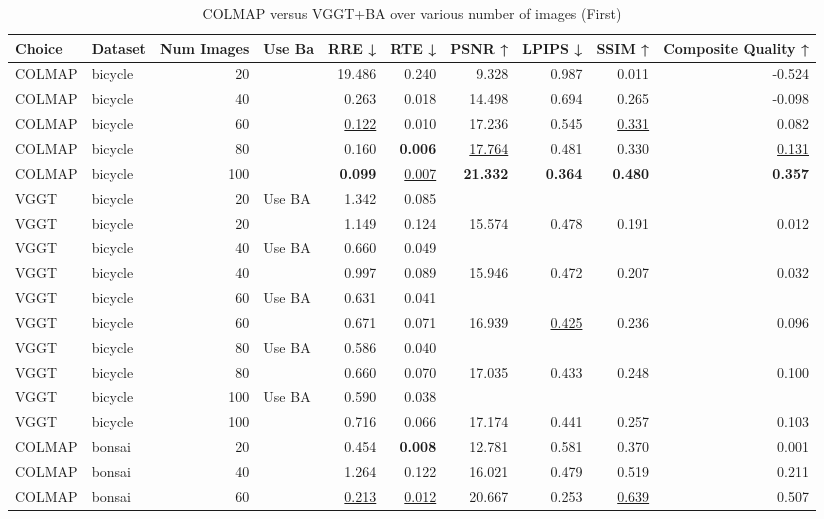 \begin{table}[H]
\caption{COLMAP versus VGGT+BA over various number of images (First)}
\label{tab:01_num_images_use_ba_first}
\small
\begin{tabular}{llrlrrrrrr}
\toprule
Choice & Dataset & Num Images & Use Ba & RRE ↓ & RTE ↓ & PSNR ↑ & LPIPS ↓ & SSIM ↑ & Composite Quality ↑ \\
\midrule
COLMAP & bicycle & 20 &  & 19.486 & 0.240 & 9.328 & 0.987 & 0.011 & -0.524 \\
COLMAP & bicycle & 40 &  & 0.263 & 0.018 & 14.498 & 0.694 & 0.265 & -0.098 \\
COLMAP & bicycle & 60 &  & \underline{0.122} & 0.010 & 17.236 & 0.545 & \underline{0.331} & 0.082 \\
COLMAP & bicycle & 80 &  & 0.160 & \textbf{0.006} & \underline{17.764} & 0.481 & 0.330 & \underline{0.131} \\
COLMAP & bicycle & 100 &  & \textbf{0.099} & \underline{0.007} & \textbf{21.332} & \textbf{0.364} & \textbf{0.480} & \textbf{0.357} \\
VGGT & bicycle & 20 & Use BA & 1.342 & 0.085 &  &  &  &  \\
VGGT & bicycle & 20 &  & 1.149 & 0.124 & 15.574 & 0.478 & 0.191 & 0.012 \\
VGGT & bicycle & 40 & Use BA & 0.660 & 0.049 &  &  &  &  \\
VGGT & bicycle & 40 &  & 0.997 & 0.089 & 15.946 & 0.472 & 0.207 & 0.032 \\
VGGT & bicycle & 60 & Use BA & 0.631 & 0.041 &  &  &  &  \\
VGGT & bicycle & 60 &  & 0.671 & 0.071 & 16.939 & \underline{0.425} & 0.236 & 0.096 \\
VGGT & bicycle & 80 & Use BA & 0.586 & 0.040 &  &  &  &  \\
VGGT & bicycle & 80 &  & 0.660 & 0.070 & 17.035 & 0.433 & 0.248 & 0.100 \\
VGGT & bicycle & 100 & Use BA & 0.590 & 0.038 &  &  &  &  \\
VGGT & bicycle & 100 &  & 0.716 & 0.066 & 17.174 & 0.441 & 0.257 & 0.103 \\
\midrule
COLMAP & bonsai & 20 &  & 0.454 & \textbf{0.008} & 12.781 & 0.581 & 0.370 & 0.001 \\
COLMAP & bonsai & 40 &  & 1.264 & 0.122 & 16.021 & 0.479 & 0.519 & 0.211 \\
COLMAP & bonsai & 60 &  & \underline{0.213} & \underline{0.012} & 20.667 & 0.253 & \underline{0.639} & 0.507 \\

\end{tabular}
\end{table}
